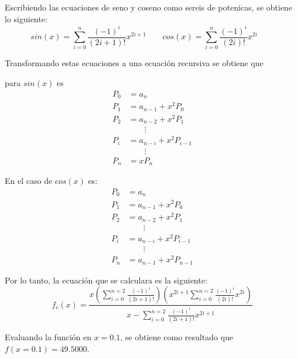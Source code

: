 Escribiendo las ecuaciones de seno y coseno como sereis de potenicas, se obtiene lo siguiente:
\begin{equation*}
    sin(x) = \sum_{i=0}^n \frac{(-1)^i}{(2i+1)!} x^{2i+1} \qquad
    cos(x) = \sum_{i=0}^n \frac{(-1)^i}{(2i)!} x^{2i} \qquad
\end{equation*}

Transformando estas ecuaciones a una ecuación recursiva se obtiene que

\begin{minipage}{0.45\linewidth}
    para $sin(x)$ es
    \begin{align*}
        P_0 & = a_n                  \\
        P_1 & = a_{n-1} + x^2P_0     \\
        P_2 & = a_{n-2} + x^2P_1     \\
            & \qquad\vdots           \\
        P_i & = a_{n-i} + x^2P_{i-1} \\
            & \qquad\vdots           \\
        P_n & = xP_n
    \end{align*}
\end{minipage}
\begin{minipage}{0.45\linewidth}
    En el caso de $cos(x)$ es:
    \begin{align*}
        P_0 & = a_n                  \\
        P_1 & = a_{n-1} + x^2P_0     \\
        P_2 & = a_{n-2} + x^2P_1     \\
            & \qquad\vdots           \\
        P_i & = a_{n-i} + x^2P_{i-1} \\
            & \qquad\vdots           \\
        P_n & = a_{n-1}+x^2P_{n-1}
    \end{align*}
\end{minipage}

Por lo tanto, la ecuación que se calculara es la siguiente:
\begin{equation}
    f_c(x) = \frac{x \left(\sum\limits_{i=0}^{n=2} \frac{(-1)^i}{(2i+1)!}\right) \left(x^{2i+1}\sum\limits_{i=0}^{n=2} \frac{(-1)^i}{(2i)!} x^{2i}\right)}{x-\sum\limits_{i=0}^{n=2} \frac{(-1)^i}{(2i+1)!} x^{2i+1}}
    \label{eq:problema_fc}
\end{equation}

Evaluando la función en $x=0.1$, se obtiene como resultado que $f(x=0.1)=49.5000$.